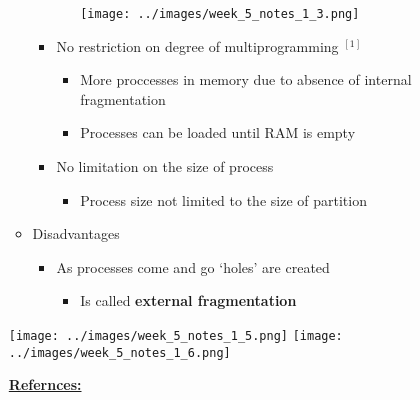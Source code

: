 \documentclass[12pt]{article}
\begin{document}
\begin{itemize}
\begin{itemize}
\begin{itemize}
\begin{itemize}
                \begin{center}
                \texttt{[image: ../images/week\_5\_notes\_1\_3.png]}
                \end{center}
            \end{itemize}
            \item No restriction on degree of multiprogramming $^{[1]}$
            \begin{itemize}
                \item More proccesses in memory due to absence of internal
                fragmentation
                \item Processes can be loaded until RAM is empty
            \end{itemize}
            \item No limitation on the size of process
            \begin{itemize}
                \item Process size not limited to the size of partition
            \end{itemize}
        \end{itemize}
        \item Disadvantages
        \begin{itemize}
            \item As processes come and go `holes' are created
            \begin{itemize}
                \item Is called \textbf{external fragmentation}
            \end{itemize}
        \end{itemize}
    \end{itemize}

    \begin{center}
    \texttt{[image: ../images/week\_5\_notes\_1\_5.png]}
    \texttt{[image: ../images/week\_5\_notes\_1\_6.png]}
    \end{center}

    \underline{\textbf{Refernces:}}

    \bigskip


\end{itemize}
\end{document}
